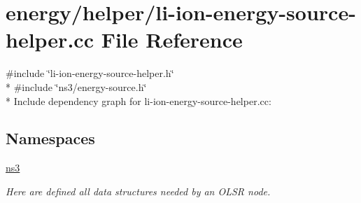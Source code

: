 \hypertarget{li-ion-energy-source-helper_8cc}{}\section{energy/helper/li-\/ion-\/energy-\/source-\/helper.cc File Reference}
\label{li-ion-energy-source-helper_8cc}
{\ttfamily \#include \char`\"{}li-\/ion-\/energy-\/source-\/helper.\+h\char`\"{}}\\*
{\ttfamily \#include \char`\"{}ns3/energy-\/source.\+h\char`\"{}}\\*
Include dependency graph for li-\/ion-\/energy-\/source-\/helper.cc\+:
\subsection*{Namespaces}
\begin{DoxyCompactItemize}
\item 
 \hyperlink{namespacens3}{ns3}
\begin{DoxyCompactList}\small\item\em Here are defined all data structures needed by an O\+L\+SR node. \end{DoxyCompactList}\end{DoxyCompactItemize}

